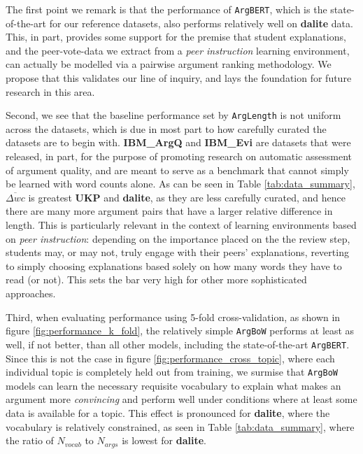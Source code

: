 \documentclass[runningheads]{llncs}
\begin{document}
The first point we remark is that the performance of \verb|ArgBERT|, which is 
the state-of-the-art for our reference datasets, also performs relatively well 
on \textbf{dalite} data.
This, in part, provides some support for the premise that student explanations, 
and the peer-vote-data we extract from a \textit{peer instruction} learning 
environment, can actually be modelled via a pairwise argument ranking 
methodology.
We propose that this validates our line of inquiry, and lays the foundation 
for future research in this area.

Second, we see that the baseline performance set by \verb|ArgLength| is 
not uniform across the datasets, which is due in most part to how carefully 
curated the datasets are to begin with.
\textbf{IBM\_ArgQ} and \textbf{IBM\_Evi} are datasets that were released, in 
part, for the purpose of promoting research on automatic assessment of argument 
quality, and are meant to serve as a benchmark that cannot simply be learned 
with word counts alone.   
As can be seen in Table \ref{tab:data_summary}, $\overline{\Delta wc}$ is 
greatest \textbf{UKP} and \textbf{dalite}, as they are less carefully curated, 
and hence there are many more argument pairs that have a larger relative 
difference in length. 
This is particularly relevant in the context of learning environments based 
on \textit{peer instruction}: depending on the importance placed on the the 
review step, students may, or may not, truly engage with their peers' 
explanations, reverting to simply choosing explanations based solely on how 
many words they have to read (or not). 
This sets the bar very high for other more sophisticated approaches.

Third, when evaluating performance using 5-fold cross-validation, as shown in 
figure \ref{fig:performance_k_fold}, the relatively simple \verb|ArgBoW| 
performs at least as well, if not better, than all other models, including the 
state-of-the-art \verb|ArgBERT|.
Since this is not the case in figure \ref{fig:performance_cross_topic}, where 
each individual topic is completely held out from training, we surmise that  
\verb|ArgBoW| models can learn the necessary requisite vocabulary 
to explain what makes an argument more \textit{convincing} and perform well 
under conditions where at least some data is available for a topic. 
This effect is pronounced for \textbf{dalite}, where the vocabulary is 
relatively constrained, as seen in Table \ref{tab:data_summary}, where the 
ratio of $N_{vocab}$ to $N_{args}$ is lowest for \textbf{dalite}. 
\end{document}
